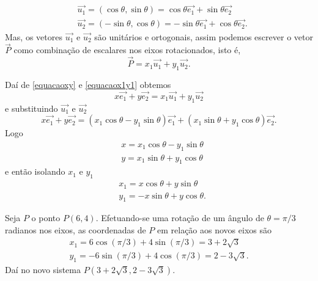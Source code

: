 \begin{align*}
  &\vec{u_1} = (\cos\theta,\sin\theta) = \cos\theta\vec{e_1} + \sin\theta\vec{e_2}\\
  &\vec{u_2} = (-\sin\theta,\cos\theta) = -\sin\theta\vec{e_1} + \cos\theta\vec{e_2}.
\end{align*}
Mas, os vetores $\vec{u_1}$ e $\vec{u_2}$ são unit\'arios e ortogonais, assim podemos escrever o vetor $\vec{P}$ como combinação de escalares nos eixos rotacionados, isto é,
\begin{equation}\label{equacaox1y1}
  \vec{P} = x_1\vec{u_1} + y_1\vec{u_2}.
\end{equation}

Daí de \eqref{equacaoxy} e \eqref{equacaox1y1} obtemos
\[
  x\vec{e_1} + y\vec{e_2} = x_1\vec{u_1} + y_1\vec{u_2}
\]
e substituindo $\vec{u_1}$ e $\vec{u_2}$
\[
  x\vec{e_1} + y\vec{e_2} = (x_1\cos\theta - y_1\sin\theta)\vec{e_1} + (x_1\sin\theta + y_1\cos\theta)\vec{e_2}.
\]
Logo
\begin{align}
  &x = x_1\cos\theta - y_1\sin\theta\label{rotacaoX}\\
  &y = x_1\sin\theta + y_1\cos\theta\label{rotacaoY}
\end{align}
e então isolando $x_1$ e $y_1$
\begin{align*}
  &x_1 = x\cos\theta + y\sin\theta\\
  &y_1 = -x\sin\theta + y\cos\theta.
\end{align*}

\begin{exemplos}
  Seja $P$ o ponto $P(6,4)$. Efetuando-se uma rotação de um ângulo de $\theta = \pi/3$ radianos nos eixos, as coordenadas de $P$ em relação aos novos eixos são
    \begin{align*}
      x_1 = 6\cos(\pi/3) + 4\sin(\pi/3) = 3 + 2\sqrt{3}\\
      y_1 = -6\sin(\pi/3) + 4\cos(\pi/3) = 2 - 3\sqrt{3}.
    \end{align*}
    Daí no novo sistema $P(3 + 2\sqrt{3}, 2 - 3\sqrt{3})$.
\end{exemplos}

